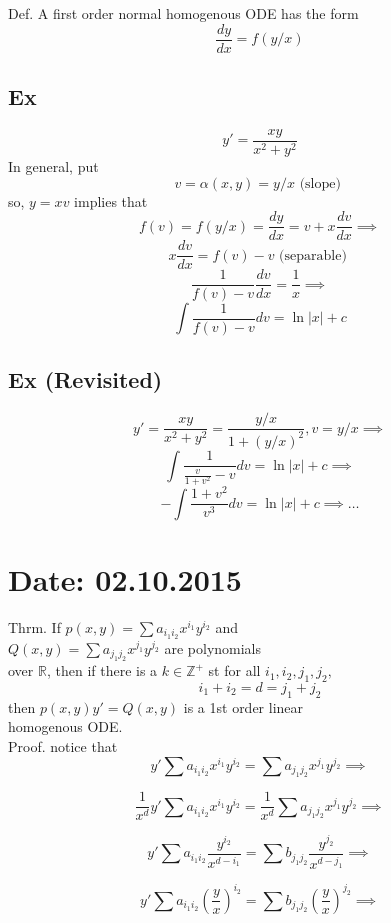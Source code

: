 \documentclass[10pt,a4paper]{article}
\begin{document}
  Def. A first order normal homogenous 
  ODE has the form 
  \[ \frac{dy}{dx} = f(y/x)\]

  \subsection{Ex}
  \[ y' = \frac{xy}{x^2 + y^2}\]
  In general, put 
  \[ v = \alpha (x, y) = y/x \text{ (slope) }\]
  so, \( y = xv\) implies that 
  \[ f(v) = f(y/x) = \frac{dy}{dx} = v + x \frac{dv}{dx} \implies \]
  \[ x \frac{dv}{dx} = f(v) - v \text{ (separable) }\]
  \[ \frac{1}{f(v) -v} \frac{dv}{dx} = \frac{1}{x} \implies \]
  \[ \int \frac{1}{f(v) -v} dv = \ln |x| + c\]

  \subsection{Ex (Revisited)}

  \[ y' = \frac{xy}{x^2 + y^2} = \frac{y/x}{1 + (y/x)^2} , v = y/x
  \implies \]
  \[ \int \frac{1}{\frac{v}{1 + v^2} -v}dv = \ln |x| + c \implies \]
  \[ - \int \frac{1 + v^2}{v^3}dv = \ln |x| + c \implies \dots \]

  \newpage 
\section{Date: 02.10.2015}
  Thrm. If \( p(x, y) = \sum a_{i_1 i_2} x^{i_1} y^{i_2} \) and \\
  \( Q(x, y) = \sum a_{j_1 j_2} x^{j_1} y^{j_2} \) are polynomials \\
  over \( \mathbb{R} \), then if there is a \( k \in \mathbb{Z}^+ \) st
  for all \( i_1, i_2, j_1, j_2,  \)
  \[ i_1 + i_2 = d = j_1 + j_2 \]
  then \( p(x, y)y'=Q(x, y)  \) is a 1st order linear \\
  homogenous ODE.\\
  Proof. notice that 
  \[ y' \sum a_{i_1 i_2} x^{i_1} y^{i_2} = 
  \sum a_{j_1 j_2} x^{j_1} y^{j_2} \implies \]

  \[ \frac{1}{x^d} y' \sum a_{i_1 i_2} x^{i_1} y^{i_2} = 
  \frac{1}{x^d} \sum a_{j_1 j_2} x^{j_1} y^{j_2} \implies \]

  \[ y' \sum a_{i_1 i_2} \frac{y^{i_2}}{x^{d-i_1}} =
  \sum b_{j_1 j_2} \frac{y^{j_2}}{x^{d-j_1}} \implies\]

  \[ y' \sum a_{i_1 i_2} (\frac{y}{x})^{i_2} =
  \sum b_{j_1 j_2} (\frac{y}{x})^{j_2}  \implies\]
\end{document}
